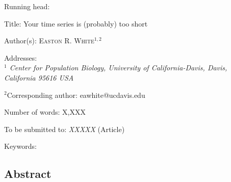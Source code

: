 \documentclass[11pt,]{article}
\title{}
\author{}
\date{}
\begin{document}
\begin{spacing}{1.5} %
    \begin{flushleft}
Running head: 
\vspace{3 mm}

Title: Your time series is (probably) too short
\vspace{7 mm}

Author(s): \textsc{Easton R. White$^{1,2}$} 
\vspace{3 mm}

Addresses: \\ \emph{$^1$ Center for Population Biology, University of California-Davis, Davis, California 95616 USA}
\vspace{3 mm}

$^2$Corresponding author: eawhite@ucdavis.edu
\vspace{3 mm}

Number of words: X,XXX 
\vspace{3 mm}

To be submitted to: \emph{XXXXX} (Article)
\vspace{3 mm}

Keywords: 

\vspace{3 mm}

\end{flushleft}
\end{spacing}

\linenumbers

\clearpage

\subsection{Abstract}\label{abstract}
\end{document}

